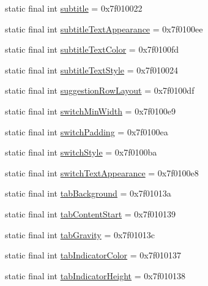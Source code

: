 \begin{CompactItemize}
\item 
static final int \hyperlink{classandroid_1_1support_1_1v7_1_1cardview_1_1_r_1_1attr_b40349ba30e30d1f1912062b3cc792de}{subtitle} = 0x7f010022
\item 
static final int \hyperlink{classandroid_1_1support_1_1v7_1_1cardview_1_1_r_1_1attr_fec22ebe6e73301aa9fedf931401d461}{subtitleTextAppearance} = 0x7f0100ee
\item 
static final int \hyperlink{classandroid_1_1support_1_1v7_1_1cardview_1_1_r_1_1attr_25c9d04040be06af760befedc0d16da9}{subtitleTextColor} = 0x7f0100fd
\item 
static final int \hyperlink{classandroid_1_1support_1_1v7_1_1cardview_1_1_r_1_1attr_8effa4309320b60c84acc2b393911ab6}{subtitleTextStyle} = 0x7f010024
\item 
static final int \hyperlink{classandroid_1_1support_1_1v7_1_1cardview_1_1_r_1_1attr_f0b35ca6fe4ee558fd47819b71e67b81}{suggestionRowLayout} = 0x7f0100df
\item 
static final int \hyperlink{classandroid_1_1support_1_1v7_1_1cardview_1_1_r_1_1attr_f0583dcaaea042255a908fff19dee1be}{switchMinWidth} = 0x7f0100e9
\item 
static final int \hyperlink{classandroid_1_1support_1_1v7_1_1cardview_1_1_r_1_1attr_756405197104a3a45c01ad111b9ac5b8}{switchPadding} = 0x7f0100ea
\item 
static final int \hyperlink{classandroid_1_1support_1_1v7_1_1cardview_1_1_r_1_1attr_cb52185fb2e6880d30f644b8a8c7c43b}{switchStyle} = 0x7f0100ba
\item 
static final int \hyperlink{classandroid_1_1support_1_1v7_1_1cardview_1_1_r_1_1attr_c42c9ad69f0f6ca69806c94e7c3e1d3e}{switchTextAppearance} = 0x7f0100e8
\item 
static final int \hyperlink{classandroid_1_1support_1_1v7_1_1cardview_1_1_r_1_1attr_ed4c45c83cdfba289f2c1b3671dc23d9}{tabBackground} = 0x7f01013a
\item 
static final int \hyperlink{classandroid_1_1support_1_1v7_1_1cardview_1_1_r_1_1attr_6201e7d1fa079c14ca94366d1083026c}{tabContentStart} = 0x7f010139
\item 
static final int \hyperlink{classandroid_1_1support_1_1v7_1_1cardview_1_1_r_1_1attr_0bfb5aebe448f018a8a2863a238483c3}{tabGravity} = 0x7f01013c
\item 
static final int \hyperlink{classandroid_1_1support_1_1v7_1_1cardview_1_1_r_1_1attr_35a0473a75a5763d28c42841719b068c}{tabIndicatorColor} = 0x7f010137
\item 
static final int \hyperlink{classandroid_1_1support_1_1v7_1_1cardview_1_1_r_1_1attr_944ede380c896317206baa4d5dc9ae8f}{tabIndicatorHeight} = 0x7f010138

\end{CompactItemize}
